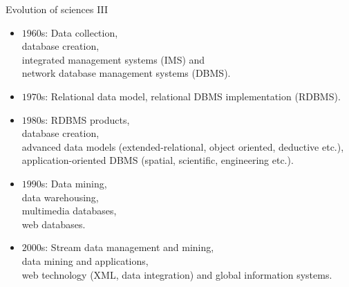 \documentclass[aspectratio=169,t]{beamer}
\begin{document}
  { 
    \begin{frame}{Evolution of sciences III}
        \begin{itemize}
            \item $1960$s: Data collection, \\
                  \hspace{1cm} database creation, \\
                  \hspace{1cm} integrated management systems (IMS) and \\
                  \hspace{1cm} network database management systems (DBMS).
            \item $1970$s: Relational data model, relational DBMS implementation (RDBMS).
            \item $1980$s: RDBMS products,\\
                  \hspace{1cm} database creation, \\
                  \hspace{1cm} advanced data models (extended-relational, object oriented, deductive etc.),\\
                  \hspace{1cm} application-oriented DBMS (spatial, scientific, engineering etc.).
            \item $1990$s: Data mining,\\
                  \hspace{1cm} data warehousing, \\
                  \hspace{1cm} multimedia databases,\\
                  \hspace{1cm} web databases.
            \item $2000$s: Stream data management and mining,\\
                  \hspace{1cm} data mining and applications, \\
                  \hspace{1cm} web technology (XML, data integration) and global information systems.
        \end{itemize}
    \end{frame}
  }
\end{document}
